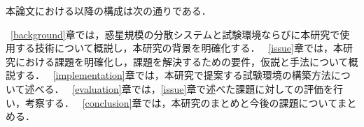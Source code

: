 本論文における以降の構成は次の通りである．

~\ref{background}章では，惑星規模の分散システムと試験環境ならびに本研究で使用する技術について概説し，本研究の背景を明確化する．
~\ref{issue}章では，本研究における課題を明確化し，課題を解決するための要件，仮説と手法について概説する．
~\ref{implementation}章では，本研究で提案する試験環境の構築方法について述べる．
~\ref{evaluation}章では，\ref{issue}章で述べた課題に対しての評価を行い，考察する．
~\ref{conclusion}章では，本研究のまとめと今後の課題についてまとめる．

